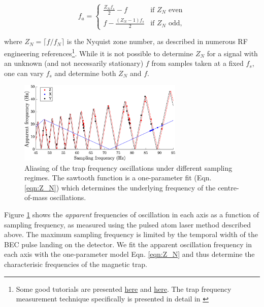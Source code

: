 	\begin{equation}
	 f_a =
	  \begin{cases}
	   \frac{Z_N f_s}{2} - f & \text{if } Z_N \text{ even} \\
	   f - \frac{(Z_N-1)f_s}{2}       & \text{if } Z_N \text{ odd},
	  \end{cases}
	  \label{eqn:Z_N}
	\end{equation}
	
	where $Z_N = \lceil{f/f_N}\rceil$ is the Nyquist zone number, as described in numerous RF engineering references\footnote{Some good tutorials are presented \href{https://www.analog.com/media/en/training-seminars/tutorials/MT-002.pdf}{here} and \href{https://www.taborelec.com/Multi-Nyquist-Zones-Operation-Solution-Note}{here}. The trap frequency measurement technique specifically is presented in detail in \cite{Henson22_PAL}}. While it is not possible to determine $Z_N$ for a signal with an unknown (and not necessarily stationary) $f$ from samples taken at a fixed $f_s$, one can vary $f_s$ and determine both $Z_N$ and $f$.
	
	\begin{figure}
	\centering
		\includegraphics[width=0.7\textwidth]{fig/QD/sawtooth}
			\caption{Aliasing of the trap frequency oscillations under different sampling regimes. The sawtooth function is a one-parameter fit (Eqn. \ref{eqn:Z_N}) which determines the underlying frequency of the centre-of-mass oscillations.}
			\label{fig:sawtooth_plot}
	\end{figure}	

	Figure \ref{fig:sawtooth_plot} shows the \emph{apparent} frequencies of oscillation in each axis as a function of sampling frequency, as measured using the pulsed atom laser method described above.
	The maximum sampling frequency is limited by the temporal width of the BEC pulse landing on the detector. 
	We fit the apparent oscillation frequency in each axis with the one-parameter model Eqn. \ref{eqn:Z_N} and thus determine the characterisic frequencies of the magnetic trap.

